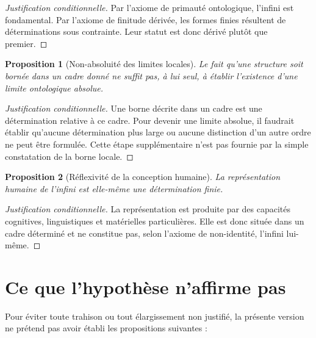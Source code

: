 \documentclass[11pt,a4paper]{article}
\newtheorem{proposition}{Proposition}
\begin{document}
\begin{proof}[Justification conditionnelle]
Par l'axiome de primauté ontologique, l'infini est fondamental. Par l'axiome de finitude dérivée, les formes finies résultent de déterminations sous contrainte. Leur statut est donc dérivé plutôt que premier.
\end{proof}

\begin{proposition}[Non-absoluité des limites locales]
Le fait qu'une structure soit bornée dans un cadre donné ne suffit pas, à lui seul, à établir l'existence d'une limite ontologique absolue.
\end{proposition}

\begin{proof}[Justification conditionnelle]
Une borne décrite dans un cadre est une détermination relative à ce cadre. Pour devenir une limite absolue, il faudrait établir qu'aucune détermination plus large ou aucune distinction d'un autre ordre ne peut être formulée. Cette étape supplémentaire n'est pas fournie par la simple constatation de la borne locale.
\end{proof}

\begin{proposition}[Réflexivité de la conception humaine]
La représentation humaine de l'infini est elle-même une détermination finie.
\end{proposition}

\begin{proof}[Justification conditionnelle]
La représentation est produite par des capacités cognitives, linguistiques et matérielles particulières. Elle est donc située dans un cadre déterminé et ne constitue pas, selon l'axiome de non-identité, l'infini lui-même.
\end{proof}

\section{Ce que l'hypothèse n'affirme pas}

Pour éviter toute trahison ou tout élargissement non justifié, la présente version ne prétend pas avoir établi les propositions suivantes :
\end{document}
